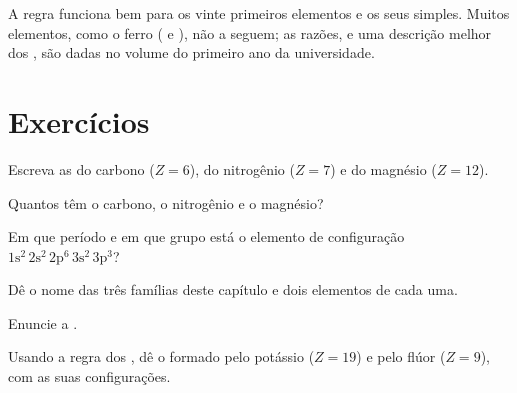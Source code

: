\begin{remark}\label{rem:g10:electron-shells:limits}
A regra funciona bem para os vinte primeiros elementos e os seus 
simples. Muitos elementos, como o ferro ( e ),
não a seguem; as razões, e uma descrição melhor dos , são dadas
no volume do primeiro ano da universidade.
\end{remark}

\section{Exercícios}

\begin{exercise}[$\star$]\label{exo:g10:electron-shells:1}
Escreva as  do carbono ($Z = 6$), do nitrogênio
($Z = 7$) e do magnésio ($Z = 12$).
\end{exercise}

\begin{exercise}[$\star$]\label{exo:g10:electron-shells:2}
Quantos  têm o carbono, o nitrogênio e o magnésio?
\end{exercise}

\begin{exercise}[$\star$]\label{exo:g10:electron-shells:3}
Em que período e em que grupo está o elemento de configuração
$1\mathrm{s}^2\,2\mathrm{s}^2\,2\mathrm{p}^6\,3\mathrm{s}^2\,3\mathrm{p}^3$?
\end{exercise}

\begin{exercise}[$\star$]\label{exo:g10:electron-shells:4}
Dê o nome das três famílias deste capítulo e dois elementos de cada uma.
\end{exercise}

\begin{exercise}[$\star$]\label{exo:g10:electron-shells:5}
Enuncie a .
\end{exercise}

\begin{exercise}[$\star\star$]\label{exo:g10:electron-shells:6}
Usando a regra dos , dê o  formado pelo potássio
($Z = 19$) e pelo flúor ($Z = 9$), com as suas configurações.
\end{exercise}

